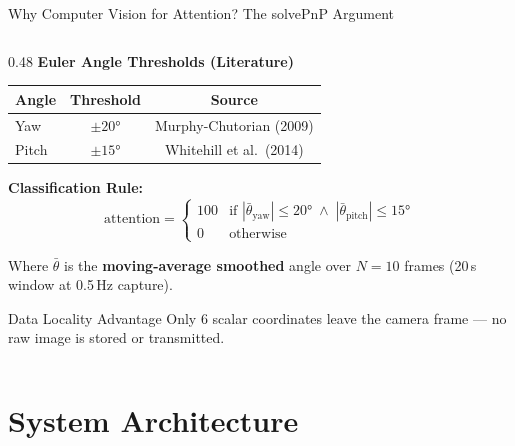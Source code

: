 \documentclass[aspectratio=169,10pt]{beamer}
\begin{document}
\begin{frame}{Why Computer Vision for Attention? The solvePnP Argument}
\begin{columns}[T]
\begin{column}{0.48\textwidth}
\textbf{Euler Angle Thresholds (Literature)}

\vspace{4pt}
\footnotesize
\begin{tabular}{@{}lcc@{}}
\toprule
\textbf{Angle} & \textbf{Threshold} & \textbf{Source} \\
\midrule
Yaw & $\pm 20°$ & Murphy-Chutorian (2009) \\
Pitch & $\pm 15°$ & Whitehill et al.\ (2014) \\
\bottomrule
\end{tabular}

\vspace{6pt}
\textbf{Classification Rule:}
\begin{equation*}
\text{attention} = \begin{cases}
100 & \text{if } |\bar{\theta}_{\text{yaw}}| \leq 20° \;\wedge\; |\bar{\theta}_{\text{pitch}}| \leq 15° \\
0   & \text{otherwise}
\end{cases}
\end{equation*}

Where $\bar{\theta}$ is the \textbf{moving-average smoothed} angle over $N=10$ frames (20\,s window at 0.5\,Hz capture).

\vspace{6pt}
\begin{block}{\scriptsize Data Locality Advantage}
\scriptsize Only 6 scalar coordinates leave the camera frame --- no raw image is stored or transmitted.
\end{block}
\end{column}
\end{columns}
\end{frame}

\section{System Architecture}
\end{document}
